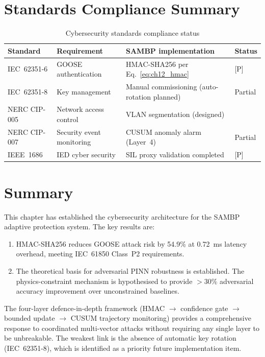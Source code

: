 \section{Standards Compliance Summary}
\label{sec:ch12_standards}

\begin{table}[htbp]
\caption{Cybersecurity standards compliance status}
\label{tab:ch12_standards}
\begin{tabularx}{\textwidth}{@{}lp{5cm}Xl@{}}
\toprule
Standard & Requirement & SAMBP implementation & Status \\
\midrule
IEC~62351-6 & GOOSE authentication & HMAC-SHA256 per Eq.~\eqref{eq:ch12_hmac} & [P] \\
IEC~62351-8 & Key management & Manual commissioning (auto-rotation planned) & Partial \\
NERC CIP-005 & Network access control & VLAN segmentation (designed) \\
NERC CIP-007 & Security event monitoring & CUSUM anomaly alarm (Layer~4) & Partial \\
IEEE~1686 & IED cyber security & SIL proxy validation completed & [P] \\
\bottomrule
\end{tabularx}
\end{table}

\section{Summary}
\label{sec:ch12_summary}

This chapter has established the cybersecurity architecture for the SAMBP
adaptive protection system. The key results are:

\begin{enumerate}
\item HMAC-SHA256 reduces GOOSE attack risk by 54.9\%
      at 0.72~ms latency overhead, meeting IEC~61850 Class~P2 requirements.
\item The theoretical basis for adversarial
      PINN robustness is established. The physics-constraint mechanism
      is hypothesised to provide $> 30\%$ adversarial accuracy improvement
      over unconstrained baselines.
\end{enumerate}

The four-layer defence-in-depth framework (HMAC $\to$ confidence gate
$\to$ bounded update $\to$ CUSUM trajectory monitoring) provides a
comprehensive response to coordinated multi-vector attacks without
requiring any single layer to be unbreakable. The weakest link is the
absence of automatic key rotation (IEC~62351-8), which is identified as
a priority future implementation item.
